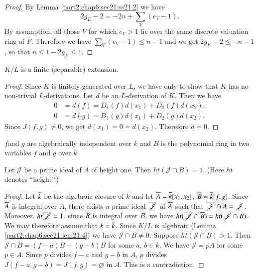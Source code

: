 \begin{proof}
  By Lemma \ref{part2:chap6:sec21:ss21.2} we have
  $$
  2g_E - 2 = - 2n + \sum_V (e_V-1).
  $$
  By assumption, all those $V$ for which $e_V>1$ lie over the same
  discrete valuation ring of $F$. Therefore we have
  $\displaystyle{\sum_V (e_V-1) \leq n-1}$ and we get $2 g_E - 2 \leq
  -n-1$, so that $n \leq 1-2 g_E \leq 1$.
\end{proof}

\begin{lemma}\label{part2:chap6:sec21:lem21.4}
  $K/L$ is a finite (separable) extension.
\end{lemma}

\begin{proof}
  Since $K$ is finitely generated over $L$, we have only to show that
  $K$ has no non-trivial $L$-derivations. Let $d$ be an $L$-derivation
  of $K$. Then we have 
\begin{align*}
  0 & = d(f) = D_1 (f) d(x_1)+ D_2(f) d(x_2),\\
  0 & = d(g) = D_1 (g) d(x_1)+ D_2 (g) d(x_2).
\end{align*}
Since $J(f, g)\neq 0$, we get $d(x_1)=0=d(x_2)$. Therefore  $d=0$.
\end{proof}

\begin{coro}\label{part2:chap6:sec21:coro21.5}
  $f$\pageoriginale and $g$ are algebraically independent over $k$ and
  $B$ is the polynomial ring in two variables $f$ and $g$ over $k$. 
\end{coro}

\begin{lemma}\label{part2:chap6:sec21:lem21.6}
  Let $\mathscr{J}$ be a prime ideal of $A$ of height one. Then $ht
  (\mathscr{J} \cap B)=1$. (Here $ht$ denotes ``height''.)
\end{lemma}

\begin{proof}
  Let $\overline{k}$ be the algebraic closure of $k$ and let $\overline{A} =
  \overline{k} [x_1, x_2]$, $\overline{B}= \overline{k} [f, g]$. Since $\overline{A}$ is
  integral over $A$, there exists a prime ideal $\overline{\mathscr{J}}$ of
  $\overline{A}$ such that $\overline{\mathscr{J}} \cap A =
  \mathscr{J}$. Moreover, $ht \overline{\mathscr{J}} =1$. since $\overline{B}$ is
  integral over $B$, we have $ht(\overline{\mathscr{J}} \cap \overline{B})= ht
  (\mathscr{J} \cap B)$. We may therefore assume that $k=
  \overline{k}$. Since $K/L$ is algebraic (Lemma
  \ref{part2:chap6:sec21:lem21.4}) we have $\mathscr{J} \cap B \neq
  0$. Suppose $ht (\mathscr{J} \cap B)> 1$. Then $\mathscr{J} \cap B=
  (f-a) B+ (g-b)B$ for some $a$, $b \in k$. We have $\mathscr{J}= pA$
  for some $p \in A$. Since $p$ divides $f-a$ and $g-b$ in $A$,
  $p$ divides $J(f-a , g-b)= J(f, g)= \diameter$ in $A$. This is a
  contradiction. 
\end{proof}

